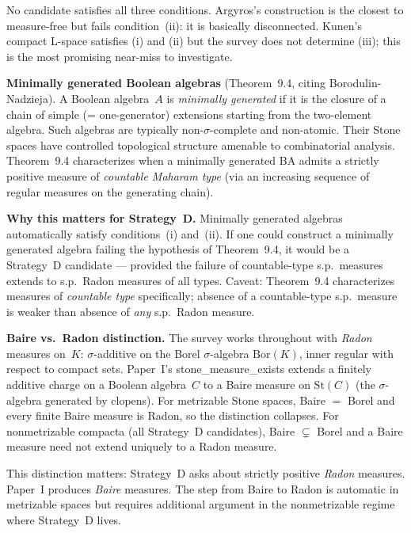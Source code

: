 \smallskip\noindent
No candidate satisfies all three conditions.  Argyros's construction
is the closest to measure-free but fails condition~(ii): it is
basically disconnected.  Kunen's compact L-space satisfies (i) and
(ii) but the survey does not determine (iii); this is the most
promising near-miss to investigate.

\medskip\noindent
\textbf{Minimally generated Boolean algebras} (Theorem~9.4,
citing Borodulin-Nadzieja).  A Boolean algebra~$A$ is \emph{minimally
generated} if it is the closure of a chain of simple (= one-generator)
extensions starting from the two-element algebra.  Such algebras are
typically non-$\sigma$-complete and non-atomic.  Their Stone spaces
have controlled topological structure amenable to combinatorial
analysis.  Theorem~9.4 characterizes when a minimally generated BA
admits a strictly positive measure of \emph{countable Maharam type}
(via an increasing sequence of regular measures on the generating
chain).

\textbf{Why this matters for Strategy~D.}  Minimally generated
algebras automatically satisfy conditions~(i) and~(ii).  If one
could construct a minimally generated algebra failing the hypothesis
of Theorem~9.4, it would be a Strategy~D candidate --- provided the
failure of countable-type s.p.\ measures extends to s.p.\ Radon
measures of all types.  Caveat: Theorem~9.4 characterizes measures of
\emph{countable type} specifically; absence of a countable-type s.p.\
measure is weaker than absence of \emph{any} s.p.\ Radon measure.

\medskip\noindent
\textbf{Baire vs.\ Radon distinction.}  The survey works throughout
with \emph{Radon} measures on~$K$: $\sigma$-additive on the Borel
$\sigma$-algebra $\text{Bor}(K)$, inner regular with respect to
compact sets.  Paper~I's stone\_measure\_exists extends a finitely
additive charge on a Boolean algebra~$C$ to a Baire measure on
$\text{St}(C)$ (the $\sigma$-algebra generated by clopens).  For
metrizable Stone spaces, Baire $=$ Borel and every finite Baire
measure is Radon, so the distinction collapses.  For nonmetrizable
compacta (all Strategy~D candidates), Baire $\subsetneq$ Borel and a
Baire measure need not extend uniquely to a Radon measure.

This distinction matters: Strategy~D asks about strictly positive
\emph{Radon} measures.  Paper~I produces \emph{Baire} measures.  The
step from Baire to Radon is automatic in metrizable spaces but
requires additional argument in the nonmetrizable regime where
Strategy~D lives.

